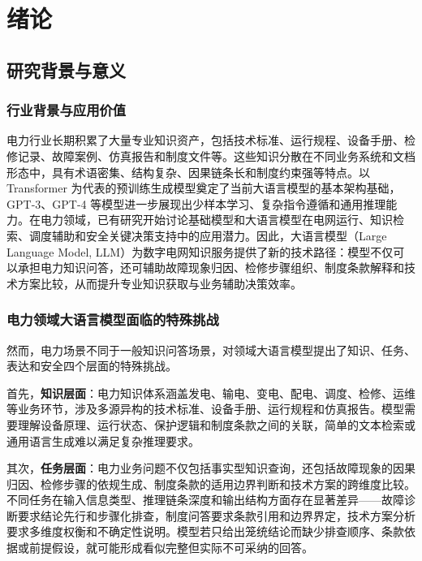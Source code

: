 \documentclass[fontset=fandol,type=master,campus=shenzhen,etitleauto=true]{hithesisbook}
\begin{document}
\makecover
\tableofcontents

\mainmatter
\chapter{绪论}\label{ux7eeaux8bba}

\section{研究背景与意义}\label{ux7814ux7a76ux80ccux666fux4e0eux610fux4e49}

\subsection{行业背景与应用价值}

电力行业长期积累了大量专业知识资产，包括技术标准、运行规程、设备手册、检修记录、故障案例、仿真报告和制度文件等。这些知识分散在不同业务系统和文档形态中，具有术语密集、结构复杂、因果链条长和制度约束强等特点。以 Transformer 为代表的预训练生成模型奠定了当前大语言模型的基本架构基础\cite{ref1}，GPT-3、GPT-4 等模型进一步展现出少样本学习、复杂指令遵循和通用推理能力\cite{ref2,ref3}。在电力领域，已有研究开始讨论基础模型和大语言模型在电网运行、知识检索、调度辅助和安全关键决策支持中的应用潜力\cite{ref4,ref5}。因此，大语言模型（Large Language Model, LLM）为数字电网知识服务提供了新的技术路径：模型不仅可以承担电力知识问答，还可辅助故障现象归因、检修步骤组织、制度条款解释和技术方案比较，从而提升专业知识获取与业务辅助决策效率。

\subsection{电力领域大语言模型面临的特殊挑战}

然而，电力场景不同于一般知识问答场景，对领域大语言模型提出了知识、任务、表达和安全四个层面的特殊挑战。

首先，\textbf{知识层面}：电力知识体系涵盖发电、输电、变电、配电、调度、检修、运维等业务环节，涉及多源异构的技术标准、设备手册、运行规程和仿真报告。模型需要理解设备原理、运行状态、保护逻辑和制度条款之间的关联，简单的文本检索或通用语言生成难以满足复杂推理要求。

其次，\textbf{任务层面}：电力业务问题不仅包括事实型知识查询，还包括故障现象的因果归因、检修步骤的依规生成、制度条款的适用边界判断和技术方案的跨维度比较。不同任务在输入信息类型、推理链条深度和输出结构方面存在显著差异——故障诊断要求结论先行和步骤化排查，制度问答要求条款引用和边界界定，技术方案分析要求多维度权衡和不确定性说明。模型若只给出笼统结论而缺少排查顺序、条款依据或前提假设，就可能形成看似完整但实际不可采纳的回答。
\end{document}
